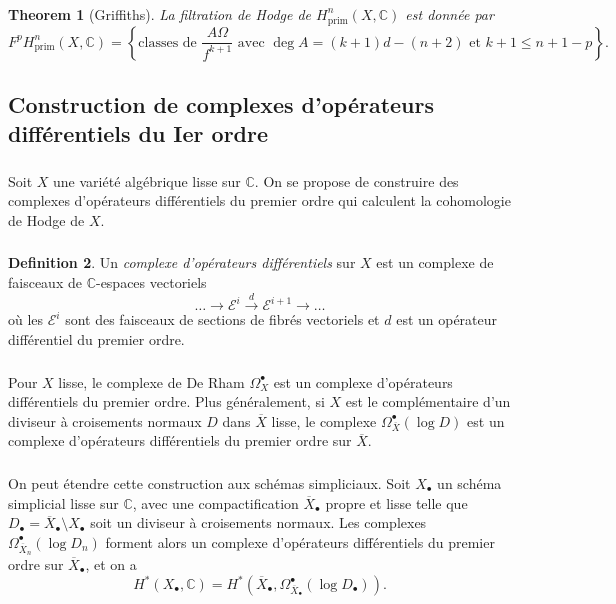 \documentclass[11pt]{amsart}
\theoremstyle{plain}
\newtheorem{theorem}{Theorem}[section]
\theoremstyle{definition}
\newtheorem{definition}[theorem]{Definition}
\newcommand{\cE}{\mathscr{E}}
\newcommand{\CC}{\mathbb{C}}
\begin{document}
\subsubsection{}
\begin{theorem}[Griffiths]
La filtration de Hodge de $H^n_{\mathrm{prim}}(X, \CC)$ est donn\'ee par
\[
F^p H^n_{\mathrm{prim}}(X, \CC) = \left\{ \text{classes de } \frac{A \Omega}{f^{k+1}} \text{ avec } \deg A = (k+1)d - (n+2) \text{ et } k+1 \leq n+1-p \right\}.
\]
\end{theorem}

\subsection{Construction de complexes d'op\'erateurs diff\'erentiels du Ier ordre}

\subsubsection{}
Soit $X$ une vari\'et\'e alg\'ebrique lisse sur $\CC$. On se propose de construire des complexes d'op\'erateurs diff\'erentiels du premier ordre qui calculent la cohomologie de Hodge de $X$.

\subsubsection{}
\begin{definition}
Un \emph{complexe d'op\'erateurs diff\'erentiels} sur $X$ est un complexe de faisceaux de $\CC$-espaces vectoriels
\[
\ldots \to \cE^i \xrightarrow{d} \cE^{i+1} \to \ldots
\]
o\`u les $\cE^i$ sont des faisceaux de sections de fibr\'es vectoriels et $d$ est un op\'erateur diff\'erentiel du premier ordre.
\end{definition}

\subsubsection{}
Pour $X$ lisse, le complexe de De Rham $\Omega_X^\bullet$ est un complexe d'op\'erateurs diff\'erentiels du premier ordre. Plus g\'en\'eralement, si $X$ est le compl\'ementaire d'un diviseur \`a croisements normaux $D$ dans $\overline{X}$ lisse, le complexe $\Omega_{\overline{X}}^\bullet(\log D)$ est un complexe d'op\'erateurs diff\'erentiels du premier ordre sur $\overline{X}$.

\subsubsection{}
On peut \'etendre cette construction aux sch\'emas simpliciaux. Soit $X_\bullet$ un sch\'ema simplicial lisse sur $\CC$, avec une compactification $\overline{X}_\bullet$ propre et lisse telle que $D_\bullet = \overline{X}_\bullet \setminus X_\bullet$ soit un diviseur \`a croisements normaux. Les complexes $\Omega_{\overline{X}_n}^\bullet(\log D_n)$ forment alors un complexe d'op\'erateurs diff\'erentiels du premier ordre sur $\overline{X}_\bullet$, et on a
\[
H^*(X_\bullet, \CC) = H^*(\overline{X}_\bullet, \Omega_{\overline{X}_\bullet}^\bullet(\log D_\bullet)).
\]
\end{document}
